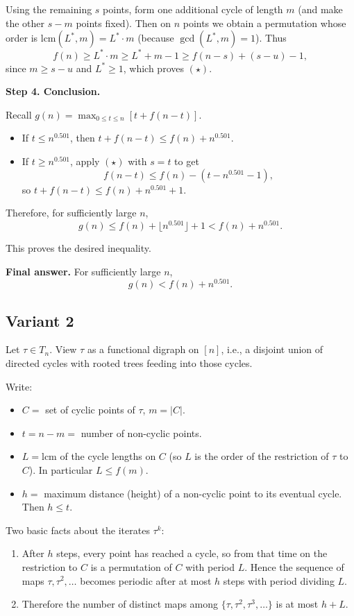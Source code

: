 \documentclass[12pt,a4paper]{article}
\theoremstyle{definition}
\begin{document}
    Using the remaining $s$ points, form one additional cycle of length $m$ (and make the other $s - m$ points fixed). Then on $n$ points we obtain a permutation whose order is $\mathrm{lcm}(L^*, m) = L^* \cdot m$ (because $\gcd(L^*, m) = 1$). Thus
    $$f(n) \geq L^* \cdot m \geq L^* + m - 1 \geq f(n - s) + (s - u) - 1,$$
    since $m \geq s - u$ and $L^* \geq 1$, which proves $(\star)$.

    \textbf{Step 4. Conclusion.}

    Recall $g(n) = \max_{0 \leq t \leq n} [t + f(n - t)]$.
    \begin{itemize}
        \item If $t \leq n^{0.501}$, then $t + f(n - t) \leq f(n) + n^{0.501}$.
        \item If $t \geq n^{0.501}$, apply $(\star)$ with $s = t$ to get
        $$f(n - t) \leq f(n) - (t - n^{0.501} - 1),$$
        so $t + f(n - t) \leq f(n) + n^{0.501} + 1$.
    \end{itemize}

    Therefore, for sufficiently large $n$,
    $$g(n) \leq f(n) + \lfloor n^{0.501} \rfloor + 1 < f(n) + n^{0.501}.$$

    This proves the desired inequality.

    \textbf{Final answer.}
    For sufficiently large $n$,
    $$g(n) < f(n) + n^{0.501}.$$

    \subsection{Variant 2}
    Let $\tau \in T_n$. View $\tau$ as a functional digraph on $[n]$, i.e., a disjoint union of directed cycles with rooted trees feeding into those cycles.

    Write:
    \begin{itemize}
        \item $C =$ set of cyclic points of $\tau$, $m = |C|$.
        \item $t = n - m =$ number of non-cyclic points.
        \item $L = \text{lcm}$ of the cycle lengths on $C$ (so $L$ is the order of the restriction of $\tau$ to $C$). In particular $L \leq f(m)$.
        \item $h =$ maximum distance (height) of a non-cyclic point to its eventual cycle. Then $h \leq t$.
    \end{itemize}

    Two basic facts about the iterates $\tau^k$:
    \begin{enumerate}
        \item After $h$ steps, every point has reached a cycle, so from that time on the restriction to $C$ is a permutation of $C$ with period $L$. Hence the sequence of maps $\tau, \tau^2, \ldots$ becomes periodic after at most $h$ steps with period dividing $L$.
        \item Therefore the number of distinct maps among $\{\tau, \tau^2, \tau^3, \ldots\}$ is at most $h + L$.
    \end{enumerate}
\end{document}
